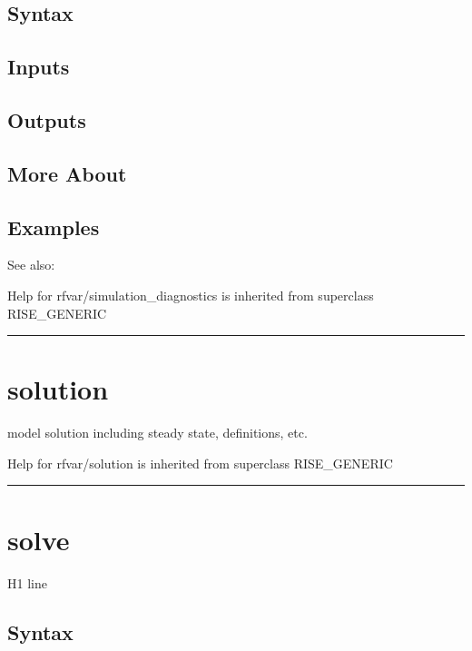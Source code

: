 \documentclass[letterpaper,10pt,english]{sphinxmanual}
\begin{document}
\subsection{Syntax}
\label{classes/models/@rfvar/rfvar:id148}

\subsection{Inputs}
\label{classes/models/@rfvar/rfvar:id149}

\subsection{Outputs}
\label{classes/models/@rfvar/rfvar:id150}

\subsection{More About}
\label{classes/models/@rfvar/rfvar:id151}

\subsection{Examples}
\label{classes/models/@rfvar/rfvar:id152}
See also:

Help for rfvar/simulation\_diagnostics is inherited from superclass RISE\_GENERIC


\bigskip\hrule{}\bigskip



\section{solution}
\label{classes/models/@rfvar/rfvar:solution}\label{classes/models/@rfvar/rfvar:id153}
model solution including steady state, definitions, etc.

Help for rfvar/solution is inherited from superclass RISE\_GENERIC


\bigskip\hrule{}\bigskip



\section{solve}
\label{classes/models/@rfvar/rfvar:id154}\label{classes/models/@rfvar/rfvar:solve}
H1 line


\subsection{Syntax}
\label{classes/models/@rfvar/rfvar:id155}
\end{document}
